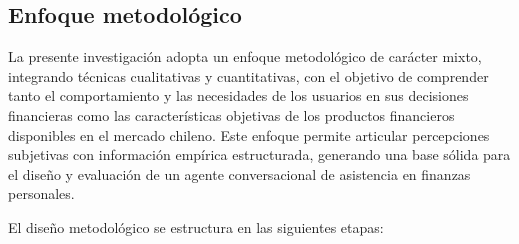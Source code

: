 \documentclass[
	spanish, %
	letterpaper, oneside
]{book}
\begin{document}
\subsection{Enfoque metodológico}

La presente investigación adopta un enfoque metodológico de carácter mixto, integrando técnicas cualitativas y cuantitativas, con el objetivo de comprender tanto el comportamiento y las necesidades de los usuarios en sus decisiones financieras como las características objetivas de los productos financieros disponibles en el mercado chileno. Este enfoque permite articular percepciones subjetivas con información empírica estructurada, generando una base sólida para el diseño y evaluación de un agente conversacional de asistencia en finanzas personales.

El diseño metodológico se estructura en las siguientes etapas:
\end{document}
